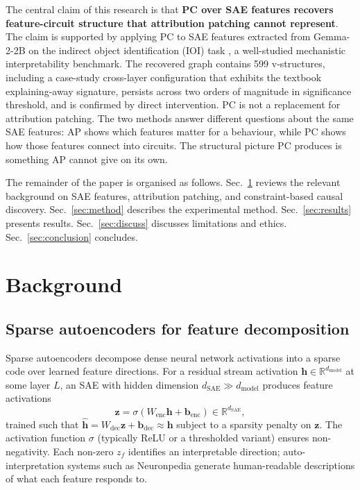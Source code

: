 \documentclass[conference]{IEEEtran}
\begin{document}
The central claim of this research is that \textbf{PC over SAE features recovers feature-circuit structure that attribution patching cannot represent}. The claim is supported by applying PC to SAE features extracted from Gemma-2-2B \cite{team2024} on the indirect object identification (IOI) task \cite{wang2022}, a well-studied mechanistic interpretability benchmark. The recovered graph contains 599 v-structures, including a case-study cross-layer configuration that exhibits the textbook explaining-away signature, persists across two orders of magnitude in significance threshold, and is confirmed by direct intervention. PC is not a replacement for attribution patching. The two methods answer different questions about the same SAE features: AP shows which features matter for a behaviour, while PC shows how those features connect into circuits. The structural picture PC produces is something AP cannot give on its own.

The remainder of the paper is organised as follows. Sec.~\ref{sec:bg} reviews the relevant background on SAE features, attribution patching, and constraint-based causal discovery. Sec.~\ref{sec:method} describes the experimental method. Sec.~\ref{sec:results} presents results. Sec.~\ref{sec:discuss} discusses limitations and ethics. Sec.~\ref{sec:conclusion} concludes.

\section{Background}\label{sec:bg}

\subsection{Sparse autoencoders for feature decomposition}\label{sec:saesub}
Sparse autoencoders \cite{bricken2023, lieberum2024} decompose dense neural network activations into a sparse code over learned feature directions. For a residual stream activation $\mathbf{h} \in \mathbb{R}^{d_{\text{model}}}$ at some layer $L$, an SAE with hidden dimension $d_{\text{SAE}} \gg d_{\text{model}}$ produces feature activations
\begin{equation}
\mathbf{z} = \sigma(W_{\text{enc}} \mathbf{h} + \mathbf{b}_{\text{enc}}) \in \mathbb{R}^{d_{\text{SAE}}},
\label{eq:sae}
\end{equation}
trained such that $\hat{\mathbf{h}} = W_{\text{dec}} \mathbf{z} + \mathbf{b}_{\text{dec}} \approx \mathbf{h}$ subject to a sparsity penalty on $\mathbf{z}$. The activation function $\sigma$ (typically ReLU or a thresholded variant) ensures non-negativity. Each non-zero $z_f$ identifies an interpretable direction; auto-interpretation systems such as Neuronpedia \cite{lin2024} generate human-readable descriptions of what each feature responds to.
\end{document}
